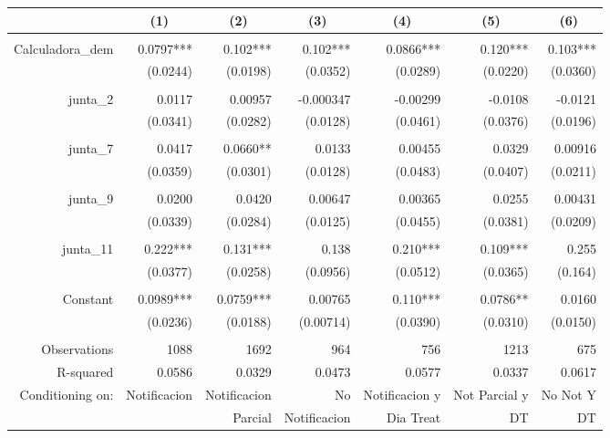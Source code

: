 \begin{tabular}{rrrrrrr}
\toprule
\multicolumn{1}{c}{} & \multicolumn{1}{c}{(1)} & \multicolumn{1}{c}{(2)} & \multicolumn{1}{c}{(3)} & \multicolumn{1}{c}{(4)} & \multicolumn{1}{c}{(5)} & \multicolumn{1}{c}{(6)} \\
\midrule
      &       &       &       &       &       &  \\
Calculadora\_dem & 0.0797*** & 0.102*** & 0.102*** & 0.0866*** & 0.120*** & 0.103*** \\
      & (0.0244) & (0.0198) & (0.0352) & (0.0289) & (0.0220) & (0.0360) \\
      &       &       &       &       &       &  \\
junta\_2 & 0.0117 & 0.00957 & -0.000347 & -0.00299 & -0.0108 & -0.0121 \\
      & (0.0341) & (0.0282) & (0.0128) & (0.0461) & (0.0376) & (0.0196) \\
      &       &       &       &       &       &  \\
junta\_7 & 0.0417 & 0.0660** & 0.0133 & 0.00455 & 0.0329 & 0.00916 \\
      & (0.0359) & (0.0301) & (0.0128) & (0.0483) & (0.0407) & (0.0211) \\
      &       &       &       &       &       &  \\
junta\_9 & 0.0200 & 0.0420 & 0.00647 & 0.00365 & 0.0255 & 0.00431 \\
      & (0.0339) & (0.0284) & (0.0125) & (0.0455) & (0.0381) & (0.0209) \\
      &       &       &       &       &       &  \\
junta\_11 & 0.222*** & 0.131*** & 0.138 & 0.210*** & 0.109*** & 0.255 \\
      & (0.0377) & (0.0258) & (0.0956) & (0.0512) & (0.0365) & (0.164) \\
      &       &       &       &       &       &  \\
Constant  & 0.0989*** & 0.0759*** & 0.00765 & 0.110*** & 0.0786** & 0.0160 \\
      & (0.0236) & (0.0188) & (0.00714) & (0.0390) & (0.0310) & (0.0150) \\
      &       &       &       &       &       &  \\
Observations & 1088  & 1692  & 964   & 756   & 1213  & 675 \\
R-squared & 0.0586 & 0.0329 & 0.0473 & 0.0577 & 0.0337 & 0.0617 \\
Conditioning on:   & Notificacion & Notificacion & No    & Notificacion y & Not Parcial y  & No Not Y \\
      &       & Parcial & Notificacion & Dia Treat & DT    & DT \\
\bottomrule
\end{tabular}%
